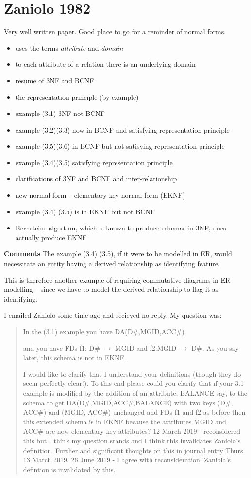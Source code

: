 \documentclass[10pt,a4paper]{scrartcl}
\newcommand{\displaybibentry}[1]
{\begin{framed}
\bibentry{#1}
\end{framed}
}
\begin{document}
\section{Zaniolo 1982}
\displaybibentry{zaniolo1982}
Very well written paper. Good place to go for a reminder of normal forms.
\begin{itemize}
\item uses the terms \textit{attribute} and \textit{domain} 
\item to each attribute of a relation there is an underlying domain
\item resume of 3NF and BCNF
\item the representation principle (by example)
\item example (3.1) 3NF not BCNF
\item example (3.2)(3.3) now in BCNF and satisfying representation principle
\item example (3.5)(3.6) in BCNF but not satisying representation principle
\item example (3.4)(3.5) satisfying representation principle
\item clarifications of 3NF and BCNF and inter-relationship
\item new normal form -- elementary key normal form (EKNF)
\item example (3.4) (3.5) is in EKNF but not BCNF
\item Bernsteins algorthm, which is known to produce schemas in 3NF, does actually produce EKNF
\end{itemize}

\textbf{Comments}
The example (3.4) (3.5), if it were to be modelled in ER, would necessitate an entity having a derived relationship as identifying feature.

This is therefore another example of requiring commutative diagrams in ER modelling -- since we have to model the derived relationship
to flag it as identifying.

I emailed Zaniolo some time ago and recieved no reply. My question was:
\begin{quote}
In the (3.1) example you have DA(D\#,MGID,ACC\#)  

and you have FDs f1: D\# $\rightarrow$ MGID and f2:MGID $\rightarrow$ D\#. As you say later, this schema is not in EKNF. 

I would like to clarify that I understand your definitions (though they do seem perfectly clear!). 
To this end please could you clarify that if your 3.1 example is modified by the addition of an attribute,
BALANCE say, to the schema to get DA(D\#,MGID,ACC\#,BALANCE) 
with two keys (D\#, ACC\#) and  (MGID, ACC\#) unchanged and FDs f1 and f2 
as before then this extended schema is in EKNF because 
the attributes MGID and ACC\# are now elementary key attributes? 
{\color{red} 12 March 2019 - reconsidered this but I think my question stands and I think this invalidates Zaniolo's definition. Further and significant thoughts on this in journal entry Thurs 13 March 2019. }
{\color{blue} 26 June 2019 - I agree with reconsideration. Zaniola's defintion is invalidated by this.}
\end{quote}
\end{document}
